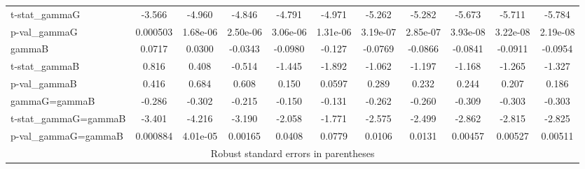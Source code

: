 \documentclass[]{article}
\begin{document}
\begin{tabular}{lcccccccccc}
t-stat\_gammaG & -3.566 & -4.960 & -4.846 & -4.791 & -4.971 & -5.262 & -5.282 & -5.673 & -5.711 & -5.784 \\
p-val\_gammaG & 0.000503 & 1.68e-06 & 2.50e-06 & 3.06e-06 & 1.31e-06 & 3.19e-07 & 2.85e-07 & 3.93e-08 & 3.22e-08 & 2.19e-08 \\
gammaB & 0.0717 & 0.0300 & -0.0343 & -0.0980 & -0.127 & -0.0769 & -0.0866 & -0.0841 & -0.0911 & -0.0954 \\
t-stat\_gammaB & 0.816 & 0.408 & -0.514 & -1.445 & -1.892 & -1.062 & -1.197 & -1.168 & -1.265 & -1.327 \\
p-val\_gammaB & 0.416 & 0.684 & 0.608 & 0.150 & 0.0597 & 0.289 & 0.232 & 0.244 & 0.207 & 0.186 \\
gammaG=gammaB & -0.286 & -0.302 & -0.215 & -0.150 & -0.131 & -0.262 & -0.260 & -0.309 & -0.303 & -0.303 \\
t-stat\_gammaG=gammaB & -3.401 & -4.216 & -3.190 & -2.058 & -1.771 & -2.575 & -2.499 & -2.862 & -2.815 & -2.825 \\
 p-val\_gammaG=gammaB & 0.000884 & 4.01e-05 & 0.00165 & 0.0408 & 0.0779 & 0.0106 & 0.0131 & 0.00457 & 0.00527 & 0.00511 \\ \hline
\multicolumn{11}{c}{ Robust standard errors in parentheses} \\
\end{tabular}
\end{document}
